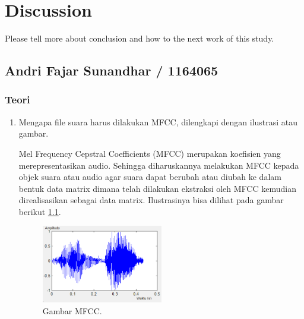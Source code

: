 \chapter{Discussion}
Please tell more about conclusion and how to the next work of this study.

\section{Andri Fajar Sunandhar / 1164065}
\subsection{Teori}
\begin{enumerate}
\item Mengapa file suara harus dilakukan MFCC, dilengkapi dengan ilustrasi atau gambar.
\par Mel Frequency Cepstral Coefficients (MFCC) merupakan koefisien yang merepresentasikan audio. Sehingga diharuskannya melakukan MFCC kepada objek suara atau audio agar suara dapat berubah atau diubah ke dalam bentuk data matrix dimana telah dilakukan ekstraksi oleh MFCC kemudian direalisasikan sebagai data matrix. Ilustrasinya bisa dilihat pada gambar berikut  \ref{no1}.
	\begin{figure}[ht]
	\centerline{\includegraphics[width=0.5\textwidth]{figures/chapter6/no1.png}}
	\caption{Gambar MFCC.}
	\label{no1}
	\end{figure}


\end{enumerate}
